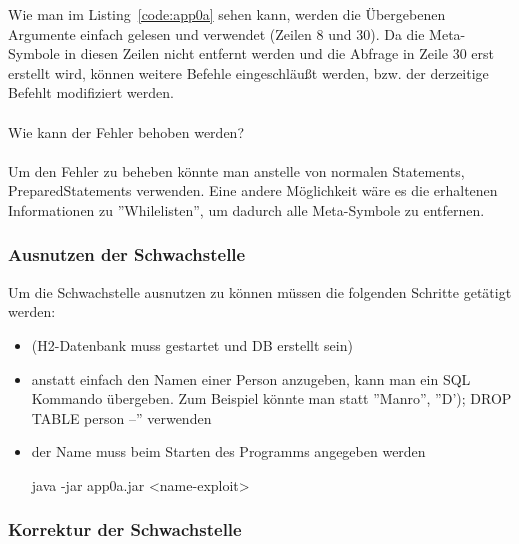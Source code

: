 \documentclass[12pt,a4paper,titlepage,oneside]{scrartcl}
\begin{document}
Wie man im Listing~\ref*{code:app0a} sehen kann, werden die Übergebenen Argumente einfach gelesen und verwendet (Zeilen 8 und 30). Da die Meta-Symbole in diesen Zeilen nicht entfernt werden und die Abfrage in Zeile 30 erst erstellt wird, können weitere Befehle eingeschläußt werden, bzw. der derzeitige Befehlt modifiziert werden. \\
\\
Wie kann der Fehler behoben werden? \\
\\
Um den Fehler zu beheben könnte man anstelle von normalen Statements, PreparedStatements verwenden. Eine andere Möglichkeit wäre es die erhaltenen Informationen zu ''Whilelisten'', um dadurch alle Meta-Symbole zu entfernen.

\subsubsection{Ausnutzen der Schwachstelle}

Um die Schwachstelle ausnutzen zu können müssen die folgenden Schritte getätigt werden:
\begin{itemize}
\item (H2-Datenbank muss gestartet und DB erstellt sein)
\item anstatt einfach den Namen einer Person anzugeben, kann man ein SQL Kommando übergeben. Zum Beispiel könnte man statt ''Manro'', ''D'); DROP TABLE person --'' verwenden
\item der Name muss beim Starten des Programms angegeben werden
	\begin{center}
	java -jar app0a.jar <name-exploit>
	\end{center}
\end{itemize}

\subsubsection{Korrektur der Schwachstelle}
\end{document}
